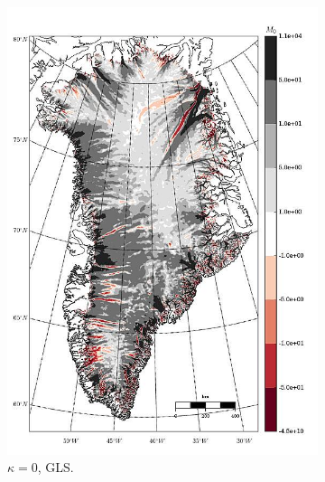 
\begin{figure}
  
  \centering 

  \begin{subfigure}[b]{0.25\linewidth}
    \includegraphics[width=\linewidth]{images/balance_velocity/greenland/d_U_ob/misfit_5H_kappa_0_GLS.jpg}
  \caption{$\kappa = 0$, GLS.}
  \label{greenland_bv_image_d_U_ob_kappa_0_GLS_misfit}
  \end{subfigure}
  \begin{subfigure}[b]{0.25\linewidth}

\end{subfigure}
\end{figure}
